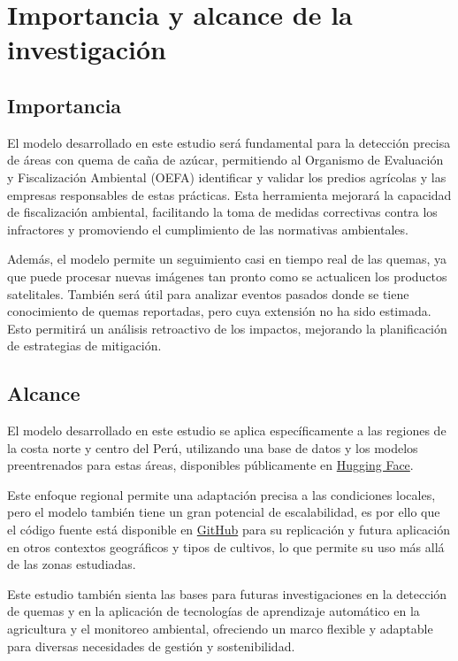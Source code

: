 \section{Importancia y alcance de la investigación}

\subsection{Importancia}
El modelo desarrollado en este estudio será fundamental para la detección precisa de áreas con quema de caña de azúcar, 
permitiendo al Organismo de Evaluación y Fiscalización Ambiental (OEFA) identificar y validar los predios agrícolas y las empresas 
responsables de estas prácticas. Esta herramienta mejorará la capacidad de fiscalización ambiental, facilitando la toma de medidas correctivas 
contra los infractores y promoviendo el cumplimiento de las normativas ambientales. 

Además, el modelo permite un seguimiento casi en tiempo real de las quemas, ya que puede procesar nuevas imágenes tan pronto como se actualicen los 
productos satelitales. También será útil para analizar eventos pasados donde se tiene conocimiento de quemas reportadas, pero cuya extensión no ha 
sido estimada. Esto permitirá un análisis retroactivo de los impactos, mejorando la planificación de estrategias de mitigación.

\subsection{Alcance}
El modelo desarrollado en este estudio se aplica específicamente a las regiones de la costa norte y centro del Perú, utilizando una base de datos 
y los modelos preentrenados para estas áreas, disponibles públicamente en \href{https://huggingface.co/datasets/jfloresf/scburning}{Hugging Face}. 

Este enfoque regional permite una adaptación precisa a las condiciones locales, pero el modelo también tiene un gran potencial de escalabilidad, es por ello que el código fuente 
está disponible en \href{https://github.com/jfloresf17/scburning}{GitHub} para su replicación y futura aplicación en otros contextos geográficos y tipos de cultivos, lo que 
permite su uso más allá de las zonas estudiadas. 

Este estudio también sienta las bases para futuras investigaciones en la detección de quemas y en la aplicación de 
tecnologías de aprendizaje automático en la agricultura y el monitoreo ambiental, ofreciendo un marco flexible y adaptable para diversas necesidades de gestión y 
sostenibilidad.